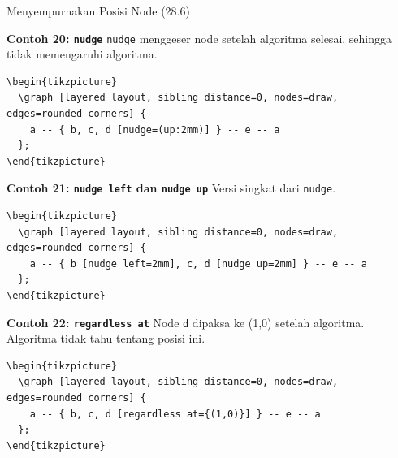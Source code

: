 \documentclass[aspectratio=169]{beamer}
\begin{document}
\begin{frame}{Menyempurnakan Posisi Node (28.6)}


\textbf{Contoh 20: \texttt{nudge}}
\texttt{nudge} menggeser node setelah algoritma selesai, sehingga tidak memengaruhi algoritma.
\begin{lstlisting}
\begin{tikzpicture}
  \graph [layered layout, sibling distance=0, nodes=draw, edges=rounded corners] {
    a -- { b, c, d [nudge=(up:2mm)] } -- e -- a
  };
\end{tikzpicture}
\end{lstlisting}
\begin{center}\end{center}


\textbf{Contoh 21: \texttt{nudge left} dan \texttt{nudge up}}
Versi singkat dari \texttt{nudge}.
\begin{lstlisting}
\begin{tikzpicture}
  \graph [layered layout, sibling distance=0, nodes=draw, edges=rounded corners] {
    a -- { b [nudge left=2mm], c, d [nudge up=2mm] } -- e -- a
  };
\end{tikzpicture}
\end{lstlisting}
\begin{center}\end{center}


\textbf{Contoh 22: \texttt{regardless at}}
Node \texttt{d} dipaksa ke (1,0) setelah algoritma. Algoritma tidak tahu tentang posisi ini.
\begin{lstlisting}
\begin{tikzpicture}
  \graph [layered layout, sibling distance=0, nodes=draw, edges=rounded corners] {
    a -- { b, c, d [regardless at={(1,0)}] } -- e -- a
  };
\end{tikzpicture}
\end{lstlisting}
\begin{center}\end{center}



\end{frame}
\end{document}
